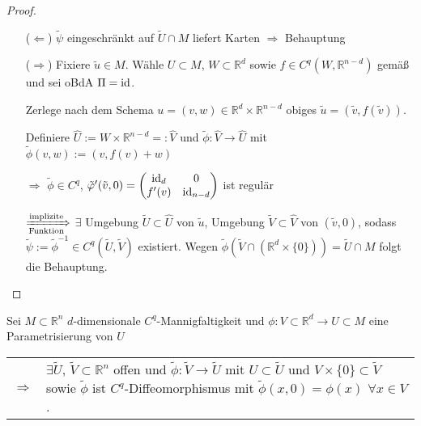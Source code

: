 \begin{proof}\hspace*{0pt}
	\vspace*{\dimexpr-\baselineskip+1mm\relax}
	\begin{itemize}
		\item[($\Leftarrow$)] $\tilde{\psi}$ eingeschränkt auf $\tilde{U}\cap M$ liefert Karten $\Rightarrow$ Behauptung
		\item[($\Rightarrow$)] Fixiere $\tilde{u}\in M$. Wähle $U\subset M$, $W\subset \mathbb{R}^d$ sowie $f\in C^q(W, \mathbb{R}^{n-d})$ gemäß  und sei oBdA $\Pi = \operatorname{id}$.
		
		Zerlege nach dem Schema $u=(v,w)\in \mathbb{R}^{d}\times\mathbb{R}^{n-d}$ obiges $\tilde{u} = (\tilde{v}, f(\tilde{v}))$.
		
		Definiere $\hat{U} := W\times \mathbb{R}^{n-d} =: \hat{V}$ und $\tilde{\phi}\!: \hat{V} \to \hat{U}$ mit $\tilde{\phi}(v,w) := (v, f(v) + w)$
		
		$\Rightarrow$ $\tilde{\phi}\in C^q$, $\tilde{\varphi}'(\tilde{v}, 0) = \begin{pmatrix}
			\operatorname{id}_{d} & 0 \\ f'(v) & \operatorname{id}_{n-d}
		\end{pmatrix}$ ist regulär
		
		$\xRightarrow[\text{Funktion}]{\text{implizite}}$ $\exists$ Umgebung $\tilde{U}\subset \hat{U}$ von $\tilde{u}$, Umgebung $\tilde{V}\subset \hat{V}$ von $(\tilde{v}, 0)$, sodass $\tilde{\psi} := \tilde{\phi}^{-1} \in C^q(\tilde{U}, \tilde{V})$ existiert. Wegen $\tilde{\phi}(\tilde{V}\cap (\mathbb{R}^d\times \{ 0\})) = \tilde{U} \cap M$ folgt die Behauptung.
	\end{itemize}
\end{proof}

\begin{conclusion}
	Sei $M\subset\mathbb{R}^n$ $d$-dimensionale $C^q$-Mannigfaltigkeit und $\phi\!: V\subset \mathbb{R}^d\to U\subset M$ eine Parametrisierung von $U$
	
	\vspace*{-0.5\baselineskip}
	\begin{tabularx}{\linewidth}{@{}r@{\ \ }X}
	$\Rightarrow$ & $\exists \tilde{U}$, $\tilde{V}\subset\mathbb{R}^n$ offen und $\tilde{\phi}\!: \tilde{V}\to \tilde{U}$ mit $U\subset\tilde{U}$ und $V\times \{ 0\} \subset \tilde{V}$ sowie $\tilde{\phi}$ ist $C^q$-Diffeomorphismus mit $\tilde{\phi}(x,0) = \phi(x)$ $\forall x\in V$.
	\end{tabularx}
\end{conclusion}

